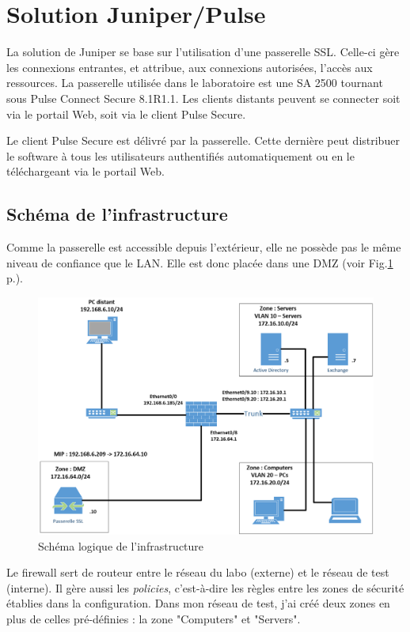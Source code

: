 \section{Solution Juniper/Pulse}
La solution de Juniper se base sur l'utilisation d'une passerelle SSL.
Celle-ci gère les connexions entrantes, et attribue, aux connexions autorisées, l'accès aux ressources.
La passerelle utilisée dans le laboratoire est une SA 2500 tournant sous Pulse Connect Secure 8.1R1.1.
Les clients distants peuvent se connecter soit via le portail Web, soit via le client Pulse Secure.

Le client Pulse Secure est délivré par la passerelle.
Cette dernière peut distribuer le software à tous les utilisateurs authentifiés automatiquement ou en le téléchargeant via le portail Web.

\subsection{Schéma de l'infrastructure}
Comme la passerelle est accessible depuis l'extérieur, elle ne possède pas le même niveau de confiance que le LAN.
Elle est donc placée dans une DMZ (voir Fig.\ref{fig:schemaJuniper} p.\pageref{fig:schemaJuniper}).
\begin{figure}[ht]
	\centering
	\includegraphics[width=16cm]{juniper/schema.png}
	\caption{Schéma logique de l'infrastructure}
	\label{fig:schemaJuniper}
\end{figure}

Le firewall sert de routeur entre le réseau du labo (externe) et le réseau de test (interne).
Il gère aussi les \textit{policies}, c'est-à-dire les règles entre les zones de sécurité établies dans la configuration.
Dans mon réseau de test, j'ai créé deux zones en plus de celles pré-définies : la zone "Computers" et "Servers".

